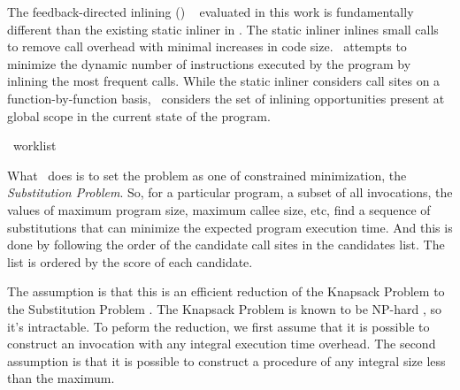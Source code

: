 
The feedback-directed inlining (\FDI) ~\cite{BerubePhD} evaluated in this work is
fundamentally different than the existing static inliner in \llvm.
The static inliner inlines small calls to remove call overhead with
minimal increases in code size.  \FDI\ attempts to minimize the
dynamic number of instructions executed by the program by inlining the
most frequent calls.  While the static inliner considers call sites on
a function-by-function basis, \FDI\ considers the set of inlining
opportunities present at global scope in the current state of the
program.

\begin{algorithm}[t!p]
\begin{small}
  
\end{small}
  \caption{\FDI\ worklist}
  \label{alg:fdiworklist}
\end{algorithm}

What \FDI\ does is to set the problem as one of constrained minimization,
the {\it Substitution Problem}. So, for a particular program, a subset of
all invocations, the values of maximum program size, maximum callee size,
etc, find a sequence of substitutions that can minimize the expected
program execution time. And this is done by following the order of the
candidate call sites in the candidates list. The list is ordered by the
score of each candidate.

The assumption is that this is an efficient reduction of the Knapsack
Problem to the Substitution Problem \cite{Arnold00,Scheifler1977}. The
Knapsack Problem is known to be NP-hard \cite{Garey1979}, so it's
intractable. To peform the reduction, we first assume that it is
possible to construct an invocation with any integral execution time
overhead. The second assumption is that it is possible to construct a
procedure of any integral size less than the maximum.

